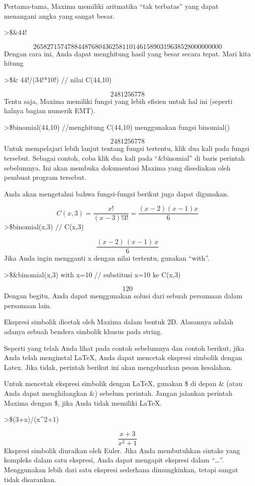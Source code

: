 \documentclass[
]{book}
\begin{document}
Pertama-tama, Maxima memiliki aritmatika ``tak terbatas'' yang dapat menangani angka yang sangat besar.

\textgreater\$\&44!

\[2658271574788448768043625811014615890319638528000000000\]Dengan cara ini, Anda dapat menghitung hasil yang besar secara tepat. Mari kita hitung

\textgreater\$\& 44!/(34!*10!) // nilai C(44,10)

\[2481256778\]Tentu saja, Maxima memiliki fungsi yang lebih efisien untuk hal ini (seperti halnya bagian numerik EMT).

\textgreater\$binomial(44,10) //menghitung C(44,10) menggunakan fungsi binomial()

\[2481256778\]Untuk mempelajari lebih lanjut tentang fungsi tertentu, klik dua kali pada fungsi tersebut. Sebagai contoh, coba klik dua kali pada ``\&binomial'' di baris perintah sebelumnya. Ini akan membuka dokumentasi Maxima yang disediakan oleh pembuat program tersebut.

Anda akan mengetahui bahwa fungsi-fungsi berikut juga dapat digunakan.

\[C(x,3)=\frac{x!}{(x-3)!3!}=\frac{(x-2)(x-1)x}{6}\]\textgreater\$binomial(x,3) // C(x,3)

\[\frac{\left(x-2\right)\,\left(x-1\right)\,x}{6}\]Jika Anda ingin mengganti x dengan nilai tertentu, gunakan ``with''.

\textgreater\$\&binomial(x,3) with x=10 // substitusi x=10 ke C(x,3)

\[120\]Dengan begitu, Anda dapat menggunakan solusi dari sebuah persamaan dalam persamaan lain.

Ekspresi simbolik dicetak oleh Maxima dalam bentuk 2D. Alasannya adalah adanya sebuah bendera simbolik khusus pada string.

Seperti yang telah Anda lihat pada contoh sebelumnya dan contoh berikut, jika Anda telah menginstal LaTeX, Anda dapat mencetak ekspresi simbolik dengan Latex. Jika tidak, perintah berikut ini akan mengeluarkan pesan kesalahan.

Untuk mencetak ekspresi simbolik dengan LaTeX, gunakan \$ di depan \& (atau Anda dapat menghilangkan \&) sebelum perintah. Jangan jalankan perintah Maxima dengan \$, jika Anda tidak memiliki LaTeX.

\textgreater\$(3+x)/(x\^{}2+1)

\[\frac{x+3}{x^2+1}\]Ekspresi simbolik diuraikan oleh Euler. Jika Anda membutuhkan sintaks yang kompleks dalam satu ekspresi, Anda dapat mengapit ekspresi dalam ``\ldots{}''. Menggunakan lebih dari satu ekspresi sederhana dimungkinkan, tetapi sangat tidak disarankan.
\end{document}
